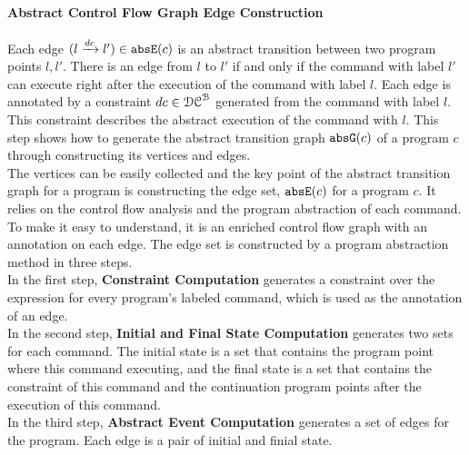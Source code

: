 \paragraph{Abstract Control Flow Graph Edge Construction}
\label{sec:abscfg-edge}
Each edge $(l \xrightarrow{dc} l') \in \mathtt{abs}{\mathtt{E}}(c)$ is an abstract transition
between two program points $l, l'$. 
There is an edge from $l$ to $l'$ if and only if
the command with label $l'$ can execute right after the execution of the command with label $l$.
Each edge is annotated by a constraint $dc \in \mathcal{DC}^{\mathcal{B}}$ generated from the command with label $l$.
This constraint describes the abstract execution of the command with $l$. 
This step shows how to generate the abstract transition graph $\mathtt{abs}{\mathtt{G}}(c)$ of a
program $c$ through constructing its vertices and edges.
\\
  The vertices can be easily collected and the key point of the abstract
  transition graph for a program is constructing the edge set, $\mathtt{abs}{\mathtt{E}}(c)$ for a program $c$.
  It relies on the control flow analysis and the program abstraction of each command.
  To make it easy to understand, it
  is an enriched control flow graph with an annotation on each edge.
  The edge set is constructed by a program abstraction method in three steps.
  \\
  In the first step, \textbf{Constraint Computation} generates a constraint
  over the expression for every program's labeled command,
  which is used as the annotation of an edge.
  \\
  In the second step, \textbf{Initial and Final State Computation} generates two sets for each command. 
  The initial state is a set that contains the
  program point where this command  executing, 
  and the final state is a set
  that contains the constraint of this command
  and the continuation program points after the execution of this command.
  \\ 
  In the third step, \textbf{Abstract Event Computation} generates a set of edges for the program.
  Each edge is a pair of initial and finial state.
%
